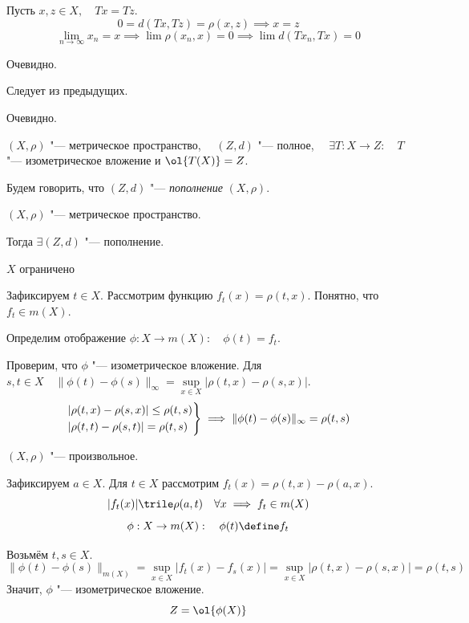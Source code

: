 \begin{eproof}
\item Пусть $ x, z \in X, \quad Tx = Tz $.
	$$ 0 = d(Tx, Tz) = \rho(x, z) \implies x = z $$
	$$ \lim\limits_{n \to \infty} x_n = x \implies \lim \rho(x_n, x) = 0 \implies \lim d(Tx_n, Tx) = 0 $$
\item Очевидно.
\item Следует из предыдущих.
\item Очевидно.
\end{eproof}

\begin{definition}
	$ (X, \rho) $ "--- метрическое пространство, $ \quad (Z, d) $ "--- полное, $ \quad \exists T : X \to Z : \quad T $ "--- изометрическое вложение и $ \ol{T(X)} = Z $.

	Будем говорить, что $ (Z, d) $ "--- \emph{пополнение} $ (X, \rho) $.
\end{definition}

\begin{theorem}
	$ (X, \rho) $ "--- метрическое пространство.

	Тогда $ \exists (Z, d) $ "--- пополнение.
\end{theorem}

\begin{iproof}
\item $ X $ ограничено

	Зафиксируем $ t \in X $.
	Рассмотрим функцию $ f_t(x) = \rho(t, x) $.
	Понятно, что $ f_t \in m(X) $.

	Определим отображение $ \phi : X \to m(X): \quad \phi(t) = f_t $.

	Проверим, что $ \phi $ "--- изометрическое вложение.
	Для $ s, t \in X \quad \|\phi(t) - \phi(s)\|_\infty = \sup\limits_{x \in X}|\rho(t, x) - \rho(s, x)| $.
	$$
	\begin{rcases}
		|\rho(t, x) - \rho(s, x)| \le \rho(t, s) \\
		|\rho(t, t) - \rho(s, t)| = \rho(t, s)
	\end{rcases} \implies \|\phi(t) - \phi(s)\|_\infty = \rho(t, s) $$
\item $ (X, \rho) $ "--- произвольное.

	Зафиксируем $ a \in X $.
	Для $ t \in X $ рассмотрим $ f_t(x) = \rho(t, x) - \rho(a, x) $.
	$$ |f_t(x)| \trile \rho(a, t) \quad \forall x \implies f_t \in m(X) $$
	$$ \phi : X \to m(X): \quad \phi(t) \define f_t $$

	Возьмём $ t, s \in X $.
	$$ \|\phi(t) - \phi(s)\|_{m(X)} = \sup\limits_{x \in X}|f_t(x) - f_s(x)| = \sup\limits_{x \in X}|\rho(t, x) - \rho(s, x)| = \rho(t, s) $$
	Значит, $ \phi $ "--- изометрическое вложение.
	$$ Z = \ol{\phi(X)} $$
\end{iproof}


